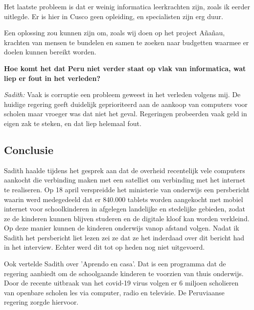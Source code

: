 Het laatste probleem is dat er weinig informatica leerkrachten zijn, zoals ik eerder uitlegde. Er is hier in Cusco geen opleiding, en specialisten zijn erg duur.

Een oplossing zou kunnen zijn om, zoals wij doen op het project Añañau, krachten van mensen te bundelen en samen te zoeken naar budgetten waarmee er doelen kunnen bereikt worden. 

\textbf{Hoe komt het dat Peru niet verder staat op vlak van informatica, wat liep er fout in het verleden?}

\textit{Sadith:} Vaak is corruptie een probleem geweest in het verleden volgens mij. De huidige regering geeft duidelijk geprioriteerd aan de aankoop van computers voor scholen maar vroeger was dat niet het geval. Regeringen probeerden vaak geld in eigen zak te steken, en dat liep helemaal fout. 
 
\subsection{Conclusie}
Sadith haalde tijdens het gesprek aan dat de overheid recentelijk vele computers aankocht die verbinding maken met een satelliet om verbinding met het internet te realiseren. Op 18 april verspreidde het ministerie van onderwijs een persbericht waarin werd medegedeeld dat er 840.000 tablets worden aangekocht met mobiel internet voor schoolkinderen in afgelegen landelijke en stedelijke gebieden, zodat ze de kinderen kunnen blijven studeren en de digitale kloof kan worden verkleind. Op deze manier kunnen de kinderen onderwijs vanop afstand volgen.\autocite{Minedu2020} Nadat ik Sadith het persbericht liet lezen zei ze dat ze het inderdaad over dit bericht had in het interview. Echter werd dit tot op heden nog niet uitgevoerd. 

Ook vertelde Sadith over 'Aprendo en casa'. Dat is een programma dat de regering aanbiedt om de schoolgaande kinderen te voorzien van thuis onderwijs. Door de recente uitbraak van het covid-19 virus volgen er 6 miljoen scholieren van openbare scholen les via computer, radio en televisie. De Peruviaanse regering zorgde hiervoor. \autocite{Minedu2020a}

